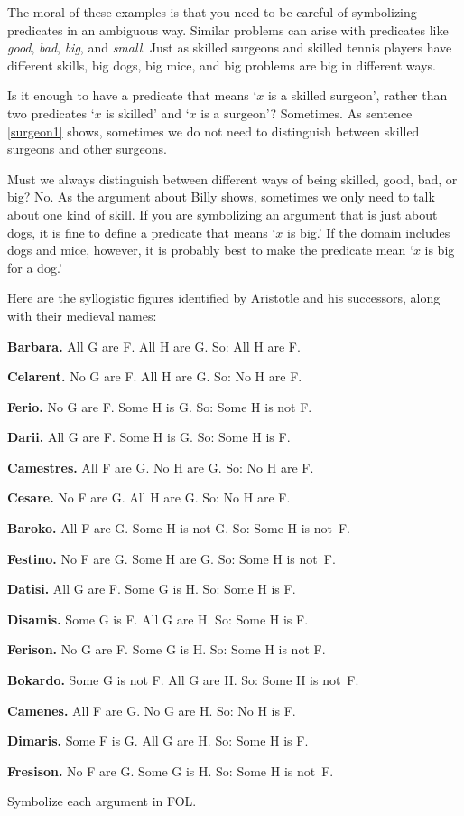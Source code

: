The moral of these examples is that you need to be careful of symbolizing predicates in an ambiguous way. Similar problems can arise with predicates like \emph{good}, \emph{bad}, \emph{big}, and \emph{small}. Just as skilled surgeons and skilled tennis players have different skills, big dogs, big mice, and big problems are big in different ways.

Is it enough to have a predicate that means `$x$ is a skilled surgeon', rather than two predicates `$x$ is skilled' and `$x$ is a surgeon'? Sometimes. As sentence \ref{surgeon1} shows, sometimes we do not need to distinguish between skilled surgeons and other surgeons.

Must we always distinguish between different ways of being skilled, good, bad, or big? No. As the argument about Billy shows, sometimes we only need to talk about one kind of skill. If you are symbolizing an argument that is just about dogs, it is fine to define a predicate that means `$x$ is big.' If the domain includes dogs and mice, however, it is probably best to make the predicate mean `$x$ is big for a dog.'

\practiceproblems
\problempart
\label{pr.BarbaraEtc}
Here are the syllogistic figures identified by Aristotle and his successors, along with their medieval names:
\begin{earg}
	\item \textbf{Barbara.} All G are F. All H are G. So:  All H are F.
	\item \textbf{Celarent.} No G are F. All H are G. So: No H are F.
	\item \textbf{Ferio.} No G are F. Some H is G. So: Some H is not F.
	\item \textbf{Darii.} All G are F. Some H is G. So: Some H is F.
	\item \textbf{Camestres.} All F are G. No H are G. So: No H are F.
	\item \textbf{Cesare.} No F are G. All H are G. So: No H are F.
	\item \textbf{Baroko.} All F are G. Some H is not G. So: Some H is not~F.
	\item \textbf{Festino.} No F are G. Some H are G. So: Some H is not~F.
	\item \textbf{Datisi.} All G are F. Some G is H. So: Some H is F.
	\item \textbf{Disamis.} Some G is F. All G are H. So: Some H is F.
	\item \textbf{Ferison.} No G are F. Some G is H. So: Some H is not F.
	\item \textbf{Bokardo.} Some G is not F. All G are H. So:  Some H is not~F.
	\item \textbf{Camenes.} All F are G. No G are H. So: No H is F.
	\item \textbf{Dimaris.} Some F is G. All G are H. So: Some H is F.
	\item \textbf{Fresison.} No F are G. Some G is H. So: Some H is not~F.
\end{earg}
Symbolize each argument in FOL.

